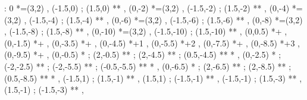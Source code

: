 \documentclass[a4paper,12pt]{article}
\newcommand{\actionsym}[1]{{\mbox{\color{Emerald}{\{$#1$\}}}}}
\begin{document}
\begin{table}[hbtp]

\xy <1cm,0cm>:
0 *=(3,2)\frm{-} ,
(-1.5,0) ; (1.5,0) **\dir{--} ,
(0,-2) *=(3,2)\frm{-} ,
(-1.5,-2) ; (1.5,-2) **\dir{--} ,
(0,-4) *=(3,2)\frm{-} ,
(-1.5,-4) ; (1.5,-4) **\dir{--} ,
(0,-6) *=(3,2)\frm{-} ,
(-1.5,-6) ; (1.5,-6) **\dir{--} ,
(0,-8) *=(3,2)\frm{-} ,
(-1.5,-8) ; (1.5,-8) **\dir{--} ,
(0,-10) *=(3,2)\frm{-} ,
(-1.5,-10) ; (1.5,-10) **\dir{--} ,
\POS (0,0.5) *+{\actionsym{E}} ,
\POS (0,-1.5) *+{\actionsym{E}} ,
\POS (0,-3.5) *+{\actionsym{ADD}} ,
\POS (0,-4.5) *+{1} ,
\POS (0,-5.5) *+{2} ,
\POS (0,-7.5) *+{\actionsym{ANSWER}} ,
\POS (0,-8.5) *+{3} ,
\POS (0,-9.5) *+{\triangledown} ,
(0,-0.5) *{\bullet} ; (2,-0.5) **\dir{-} ;
(2,-4.5) **\dir{-} ;
(0.5,-4.5) **\dir{-} *\dir{>} ,
(0,-2.5) *{\bullet} ; (-2,-2.5) **\dir{-} ;
(-2,-5.5) **\dir{-} ;
(-0.5,-5.5) **\dir{-} *\dir{>} ,
(0,-6.5) *{\bullet} ; (2,-6.5) **\dir{-} ;
(2,-8.5) **\dir{-} ;
(0.5,-8.5) **\dir{-} *\dir{>} ,
(-1.5,1) ; (1.5,-1) **\dir{-} ,
(1.5,1) ; (-1.5,-1) **\dir{-} ,
(-1.5,-1) ; (1.5,-3) **\dir{-} ,
(1.5,-1) ; (-1.5,-3) **\dir{-} ,
\endxy

\end{table}
\end{document}
